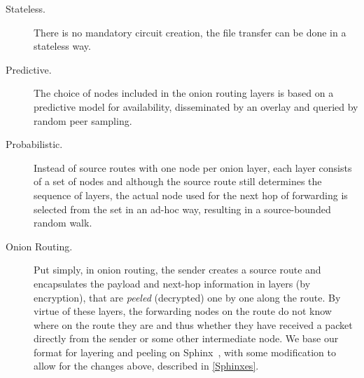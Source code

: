 \begin{description}
\item [Stateless.] There is no mandatory circuit creation, the file transfer can be
  done in a stateless way. 
\item [Predictive.] The choice of nodes included in the onion routing
  layers is based on a predictive model for availability, disseminated
  by an overlay and queried by random peer sampling.
\item [Probabilistic.] Instead of source routes with one node per onion layer, each
  layer consists of a set of nodes and although the source route still
  determines the sequence of layers, the actual node used for the next
  hop of forwarding is selected from the set in an ad-hoc way,
  resulting in a source-bounded random walk.
\item[Onion Routing.] Put simply, in onion routing, the sender creates
  a source route and 
  encapsulates the payload and next-hop information in layers (by
  encryption), that are \emph{peeled} (decrypted) one by one along the
  route. By virtue of these layers, the forwarding nodes on the
  route do not know where on the route they are and thus whether they
  have received a packet directly from the sender or some other
  intermediate node. We base our format for layering and peeling on
  Sphinx~\cite{Sphinx}, with some modification to allow for the
  changes above, described in \cref{Sphinxes}.
\end{description} 


